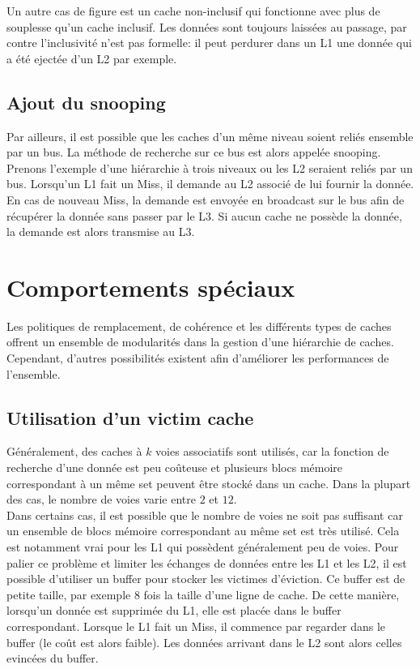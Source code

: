 \documentclass[a4paper]{article}
\begin{document}
\indent Un autre cas de figure est un cache non-inclusif qui fonctionne avec plus de souplesse qu'un cache inclusif. Les données sont toujours laissées au passage, par contre l'inclusivité n'est pas formelle: il peut perdurer dans un L1 une donnée qui a été ejectée d'un L2 par exemple.

\subsection{Ajout du snooping}
\indent Par ailleurs, il est possible que les caches d'un même niveau soient reliés ensemble par un bus. La méthode de recherche sur ce bus est alors appelée snooping. Prenons l'exemple d'une hiérarchie à trois niveaux ou les L2 seraient reliés par un bus. Lorsqu'un L1 fait un Miss, il demande au L2 associé de lui fournir la donnée. En cas de nouveau Miss, la demande est envoyée en broadcast sur le bus afin de récupérer la donnée sans passer par le L3. Si aucun cache ne possède la donnée, la demande est alors transmise au L3.

\newpage
\section{Comportements spéciaux}
\indent Les politiques de remplacement, de cohérence et les différents types de caches offrent un ensemble de modularités dans la gestion d'une hiérarchie de caches. Cependant, d'autres possibilités existent afin d'améliorer les performances de l'ensemble.

\subsection{Utilisation d'un victim cache}
\indent Généralement, des caches à $k$ voies associatifs sont utilisés, car la fonction de recherche d'une donnée est peu coûteuse et plusieurs blocs mémoire correspondant à un même set peuvent être stocké dans un cache. Dans la plupart des cas, le nombre de voies varie entre $2$ et $12$. \\

\indent Dans certains cas, il est possible que le nombre de voies ne soit pas suffisant car un ensemble de blocs mémoire correspondant au même set est très utilisé. Cela est notamment vrai pour les L1 qui possèdent généralement peu de voies. Pour palier ce problème et limiter les échanges de données entre les L1 et les L2, il est possible d'utiliser un buffer pour stocker les victimes d'éviction. Ce buffer est de petite taille, par exemple $8$ fois la taille d'une ligne de cache. De cette manière, lorsqu'un donnée est supprimée du L1, elle est placée dans le buffer correspondant. Lorsque le L1 fait un Miss, il commence par regarder dans le buffer (le coût est alors faible). Les données arrivant dans le L2 sont alors celles evincées du buffer.
\end{document}
